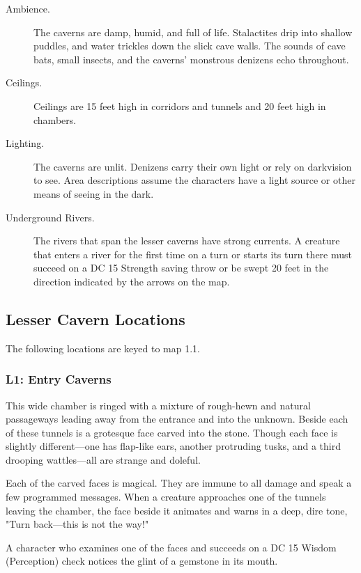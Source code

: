 \documentclass[10pt,a4paper,twoside,bg=print,twocolumn,openany,nodeprecatedcode]{dndbook}
\begin{document}
\begin{description}
\item[Ambience.]
The caverns are damp, humid, and full of life. Stalactites drip into shallow puddles, and water trickles down the slick cave walls. The sounds of cave bats, small insects, and the caverns' monstrous denizens echo throughout.
\item[Ceilings.]
Ceilings are 15 feet high in corridors and tunnels and 20 feet high in chambers.
\item[Lighting.]
The caverns are unlit. Denizens carry their own light or rely on darkvision to see. Area descriptions assume the characters have a light source or other means of seeing in the dark.
\item[Underground Rivers.]
The rivers that span the lesser caverns have strong currents. A creature that enters a river for the first time on a turn or starts its turn there must succeed on a DC 15 Strength saving throw or be swept 20 feet in the direction indicated by the arrows on the map.
\end{description}

\subsection{Lesser Cavern Locations}
The following locations are keyed to map 1.1.

\subsubsection{L1: Entry Caverns}
\begin{DndReadAloud}{}
This wide chamber is ringed with a mixture of rough-hewn and natural passageways leading away from the entrance and into the unknown. Beside each of these tunnels is a grotesque face carved into the stone. Though each face is slightly different—one has flap-like ears, another protruding tusks, and a third drooping wattles—all are strange and doleful.

\end{DndReadAloud}

Each of the carved faces is magical. They are immune to all damage and speak a few programmed messages. When a creature approaches one of the tunnels leaving the chamber, the face beside it animates and warns in a deep, dire tone, "Turn back—this is not the way!"

A character who examines one of the faces and succeeds on a DC 15 Wisdom (Perception) check notices the glint of a gemstone in its mouth.
\end{document}
